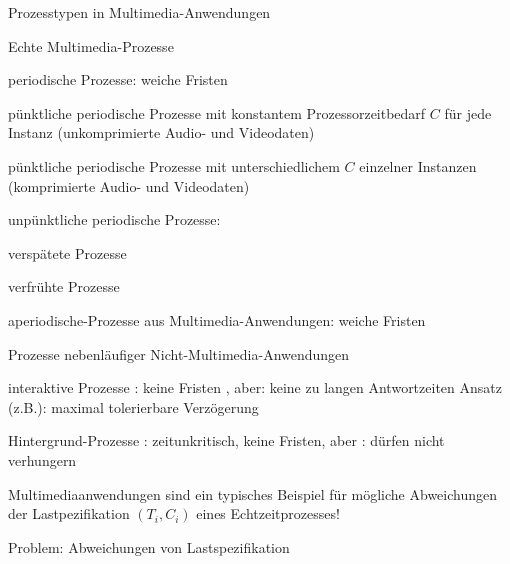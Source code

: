 \documentclass[a4paper]{article}
\begin{document}
\begin{multicols}{3}
    Prozesstypen in Multimedia-Anwendungen

    \begin{enumerate*}
        \item
        Echte Multimedia-Prozesse
    \end{enumerate*}

    \begin{itemize*}
        \item
        periodische Prozesse: weiche Fristen
        \begin{enumerate*}

            \item pünktliche periodische Prozesse mit konstantem Prozessorzeitbedarf $C$ für jede Instanz (unkomprimierte Audio- und Videodaten)
            \item pünktliche periodische Prozesse mit unterschiedlichem $C$ einzelner Instanzen (komprimierte Audio- und Videodaten)
            \item unpünktliche periodische Prozesse: \begin{itemize*} \item verspätete Prozesse \item verfrühte Prozesse \end{itemize*}
        \end{enumerate*}
        \item
        aperiodische-Prozesse aus Multimedia-Anwendungen: weiche Fristen
    \end{itemize*}

    \begin{enumerate*}
        \setcounter{enumi}{1}
        \item
        Prozesse nebenläufiger Nicht-Multimedia-Anwendungen
        \begin{itemize*}
            \item interaktive Prozesse : keine Fristen , aber: keine zu langen Antwortzeiten Ansatz (z.B.): maximal tolerierbare Verzögerung
            \item Hintergrund-Prozesse : zeitunkritisch, keine Fristen, aber : dürfen nicht verhungern
        \end{itemize*}
    \end{enumerate*}

    Multimediaanwendungen sind ein typisches Beispiel für mögliche
    Abweichungen der Lastpezifikation $(T_i,C_i)$ eines
    Echtzeitprozesses!

    Problem: Abweichungen von Lastspezifikation


\end{multicols}
\end{document}
